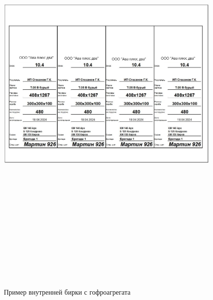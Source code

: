 

\begin{figure}[!htb]
\centering
  \includegraphics[width=140mm, height=220mm, keepaspectratio]{50_Pics/InnerLabel.JPG}
\caption{Пример внутренней бирки с гофроагрегата}
\label{pic:InnerLabel}
\end{figure} 
\FloatBarrier







